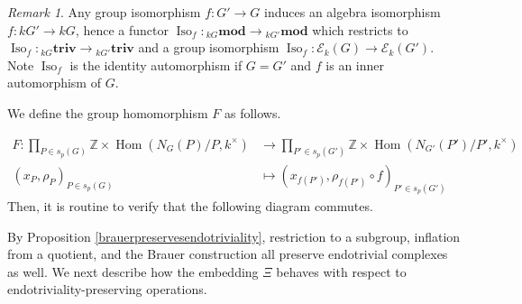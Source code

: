 \documentclass[10pt,letterpaper, boxed, cm]{amsart}
\newcommand{\Z}{\mathbb{Z}}
\newcommand{\Hom}{\operatorname{Hom}}
\newcommand{\Iso}{\operatorname{Iso}}
\newcommand{\calE}{\mathcal{E}}
\theoremstyle{remark}
\newtheorem{remark}[theorem]{Remark}
\theoremstyle{definition}
\begin{document}
	\begin{remark}
		Any group isomorphism $f: G'\to G$ induces an algebra isomorphism $f: kG' \to kG$, hence a functor $\Iso_f: {}_{kG}\mathbf{mod} \to {}_{kG'}\mathbf{mod}$ which restricts to $\Iso_f: {}_{kG}\textbf{triv} \to {}_{kG'}\textbf{triv}$ and a group isomorphism $\Iso_f: \calE_k(G) \to \calE_k(G')$. Note $\Iso_f$ is the identity automorphism if $G= G'$ and $f$ is an inner automorphism of $G$.

        We define the group homomorphism $F$ as follows.

		\begin{align*}
		F: \prod_{P \in s_p(G)} \Z \times \Hom(N_G(P)/P, k^\times) &\to \prod_{P' \in s_p(G')} \Z \times \Hom(N_{G'}(P')/P', k^\times)\\
		(x_P, \rho_P)_{P\in s_p(G)} &\mapsto (x_{f(P')},  \rho_{f(P')}\circ f )_{P'\in s_p(G')}
		\end{align*}
        Then, it is routine to verify that the following diagram commutes.
		\begin{figure}[H]
			\centering
		\end{figure}
	\end{remark}

	By Proposition \ref{brauerpreservesendotriviality}, restriction to a subgroup, inflation from a quotient, and the Brauer construction all preserve endotrivial complexes as well. We next describe how the embedding $\Xi$ behaves with respect to endotriviality-preserving operations.
\end{document}
